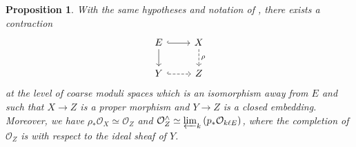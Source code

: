 \documentclass{amsart}
\newcommand{\cO}{\mathcal{O}}
\newtheorem{Prop}[theorem]{Proposition}
\theoremstyle{definition}
\begin{document}
\begin{Prop}\label{prop:existence contraction cms}
  With the same hypotheses and notation of ,  there exists a contraction 
    $$ 
    \begin{tikzcd}
    E \arrow[d] \arrow[r, hook] & X \arrow[d, dashed, "\rho"] \\
    Y \arrow[r, dashed, hook]   & Z                  
    \end{tikzcd}
    $$
   at the level of coarse moduli spaces which is an isomorphism away from $E$ and such that $X \rightarrow Z$ is a proper morphism and $Y\to Z$ is a closed embedding. Moreover, we have $\rho_*\cO_X \simeq \cO_Z$ and $\cO_Z^{\wedge} \simeq  \varprojlim_k\left(p_*\cO_{k\ell E} \right)$, where the completion of $\cO_Z$ is with respect to the ideal sheaf of $Y$.
    \end{Prop}
\end{document}
